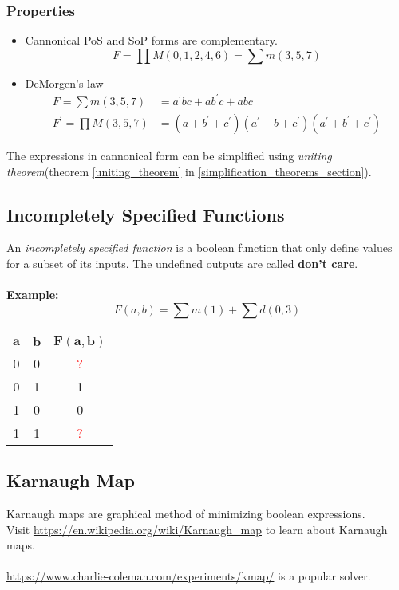 \documentclass[oneside]{book}
\begin{document}
\subsubsection{Properties}
\begin{itemize}
	\item Cannonical PoS and SoP forms are complementary.
	      \[
		      F = \prod M(0, 1, 2, 4, 6) = \sum m(3, 5, 7)
	      \]
	\item DeMorgen's law
	      \begin{align*}
		      F = \sum m(3, 5, 7)         & = a^\prime bc + ab^\prime c + abc                                                    \\
		      F^\prime = \prod M(3, 5, 7) & = (a + b^\prime + c^\prime)(a^\prime + b + c^\prime)(a^\prime + b^\prime + c^\prime)
	      \end{align*}
\end{itemize}
The expressions in cannonical form can be simplified using \textit{uniting theorem}(theorem \ref{uniting_theorem} in \cref{simplification_theorems_section}).

\subsection{Incompletely Specified Functions}
An \textit{incompletely specified function} is a boolean function that only define values for a subset of its inputs. The undefined outputs are called \textbf{don't care}.\cite{incompletely_specified_function}
\\\\
\textbf{Example:}
\[
	F(a, b) = \sum m(1) + \sum d(0, 3)
\]
\begin{table}[ht]
	\centering
	\begin{tabular}{|cc|c|}
		\hline
		$\mathbf{a}$ & $\mathbf{b}$ & $\mathbf{F(a, b)}$ \\
		\hline
		0            & 0            & \textcolor{red}{?} \\
		0            & 1            & 1                  \\
		1            & 0            & 0                  \\
		1            & 1            & \textcolor{red}{?} \\
		\hline
	\end{tabular}
\end{table}

\subsection{Karnaugh Map}
Karnaugh maps are graphical method of minimizing boolean expressions.\\
Visit \url{https://en.wikipedia.org/wiki/Karnaugh_map} to learn about Karnaugh maps. \cite{karnaugh_map_wiki}\\\\
\noindent\url{https://www.charlie-coleman.com/experiments/kmap/} is a popular solver.
\end{document}
